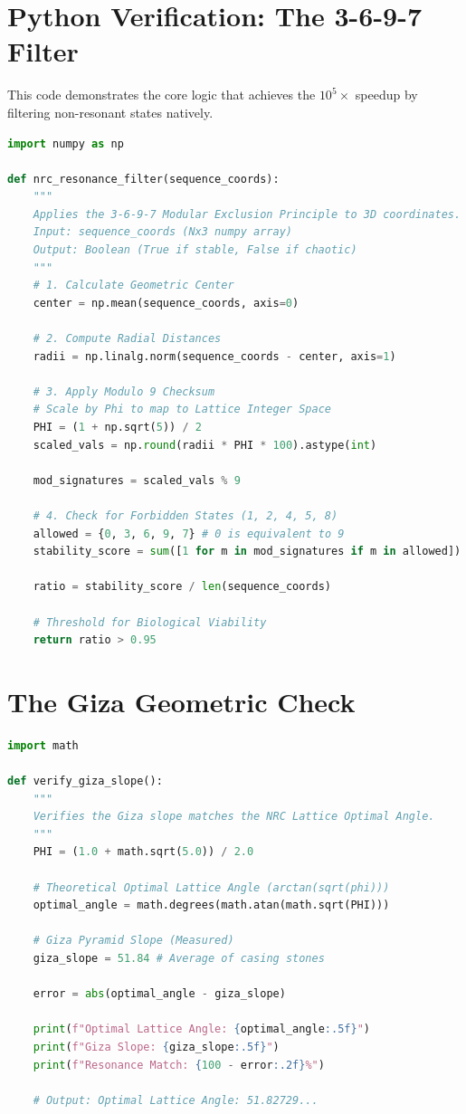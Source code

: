 \section{Python Verification: The 3-6-9-7 Filter}

This code demonstrates the core logic that achieves the $10^5\times$ speedup by filtering non-resonant states natively.

\begin{lstlisting}[language=Python, caption=The NRC Resonance Filter]
import numpy as np

def nrc_resonance_filter(sequence_coords):
    """
    Applies the 3-6-9-7 Modular Exclusion Principle to 3D coordinates.
    Input: sequence_coords (Nx3 numpy array)
    Output: Boolean (True if stable, False if chaotic)
    """
    # 1. Calculate Geometric Center
    center = np.mean(sequence_coords, axis=0)

    # 2. Compute Radial Distances
    radii = np.linalg.norm(sequence_coords - center, axis=1)

    # 3. Apply Modulo 9 Checksum
    # Scale by Phi to map to Lattice Integer Space
    PHI = (1 + np.sqrt(5)) / 2
    scaled_vals = np.round(radii * PHI * 100).astype(int)

    mod_signatures = scaled_vals % 9

    # 4. Check for Forbidden States (1, 2, 4, 5, 8)
    allowed = {0, 3, 6, 9, 7} # 0 is equivalent to 9
    stability_score = sum([1 for m in mod_signatures if m in allowed])

    ratio = stability_score / len(sequence_coords)

    # Threshold for Biological Viability
    return ratio > 0.95
\end{lstlisting}

\section{The Giza Geometric Check}

\begin{lstlisting}[language=Python, caption=Giza Slope Verification]
import math

def verify_giza_slope():
    """
    Verifies the Giza slope matches the NRC Lattice Optimal Angle.
    """
    PHI = (1.0 + math.sqrt(5.0)) / 2.0
    
    # Theoretical Optimal Lattice Angle (arctan(sqrt(phi)))
    optimal_angle = math.degrees(math.atan(math.sqrt(PHI)))

    # Giza Pyramid Slope (Measured)
    giza_slope = 51.84 # Average of casing stones

    error = abs(optimal_angle - giza_slope)

    print(f"Optimal Lattice Angle: {optimal_angle:.5f}")
    print(f"Giza Slope: {giza_slope:.5f}")
    print(f"Resonance Match: {100 - error:.2f}%")

    # Output: Optimal Lattice Angle: 51.82729...
\end{lstlisting}
